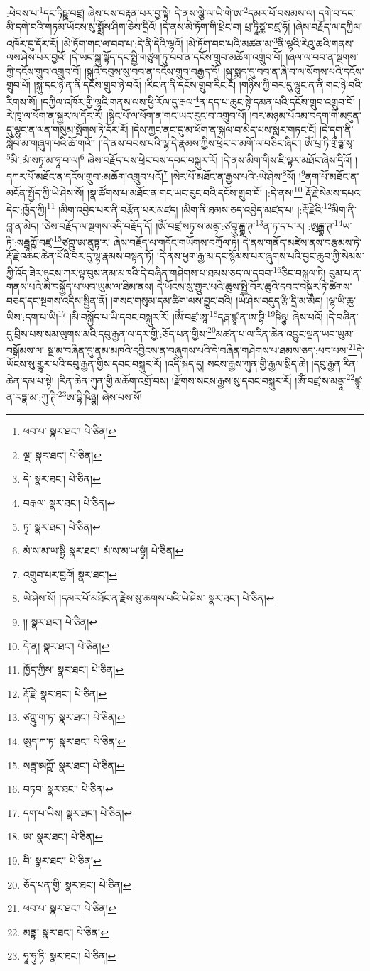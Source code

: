 :ཕེབས་པ་\footnote{ཕབ་པ་  སྣར་ཐང་།  པེ་ཅིན། }དང་ཏིཥྛ་བཛྲ། ཞེས་པས་བརྟན་པར་བྱ་སྟེ། དེ་ནས་ལྕེ་ལ་ཡི་གེ་ཨ་\footnote{ལྔ་  སྣར་ཐང་།  པེ་ཅིན། }དམར་པོ་བསམས་ལ། དགེ་བ་དང་མི་དགེ་བའི་གཏམ་ཡོངས་སུ་སྨྲོས་ཤིག་ཅེས་དྲིའོ། །དེ་ནས་མེ་ཏོག་གི་ཕྲེང་བ། པྲ་ཏཱིཙྪ་བཛྲ་ཧོ། །ཞེས་བརྗོད་ལ་དཀྱིལ་འཁོར་དུ་དོར་རོ། །མེ་ཏོག་གང་ལ་བབ་པ་:དེ་ནི་དེའི་ལྷའོ། །མེ་ཏོག་བབ་པའི་མཚན་མ་\footnote{དེ་  སྣར་ཐང་།  པེ་ཅིན། }ནི་ལྷའི་རེའུ་ཆའི་གནས་ལས་ཤེས་པར་བྱའོ། །དེ་ཡང་སྐུ་སྟོད་དང་སྤྱི་གཙུག་ཏུ་བབ་ན་དངོས་གྲུབ་མཆོག་འགྲུབ་བོ། །ཞལ་ལ་བབ་ན་སྔགས་ཀྱི་དངོས་གྲུབ་འགྲུབ་བོ། །སྐུའི་དབུས་སུ་བབ་ན་དངོས་གྲུབ་བརྒྱད་དོ། །སྐུ་སྨད་དུ་བབ་ན་ཞི་བ་ལ་སོགས་པའི་དངོས་གྲུབ་པོ། །སྐུ་དང་ཉེ་ན་ནི་དངོས་གྲུབ་ཉེ་བའོ། །རིང་ན་ནི་དངོས་གྲུབ་རིང་ངོ། །གཉིས་ཀྱི་བར་དུ་ལྷུང་ན་ནི་གང་ཉེ་བའི་རིགས་སོ། །དཀྱིལ་འཁོར་གྱི་ལྷའི་གནས་ལས་ཕྱི་རོལ་དུ་རྒལ་\footnote{བརྒལ་  སྣར་ཐང་།  པེ་ཅིན། }ན་དད་པ་ཆུང་སྟེ་དམན་པའི་དངོས་གྲུབ་འགྲུབ་བོ། །རེ་ཁཱ་ལ་ཕོག་ན་སྐྱར་ལ་དོར་རོ། །སྙིང་པོ་ལ་ཕོག་ན་གང་ཡང་རུང་བ་འགྲུབ་པོ། །བར་མཉམ་པོའམ་བདག་གི་མདུན་དུ་ལྷུང་ན་ལན་གསུམ་སྤོགས་ཏེ་དོར་རོ། །དེས་ཀྱང་ནང་དུ་མ་ཕོག་ན་སྐལ་བ་མེད་པས་སླར་གཏང་ངོ། །དེ་དག་ནི་སློབ་མ་གཞུག་པའི་ཆོ་གའོ།། །།དེ་ནས་བབས་པའི་ལྷ་དེ་རྣམས་ཀྱིས་ཕྲེང་བ་མགོ་ལ་བཅིང་ཞིང་། ཨོཾ་པྲ་ཏི་གྲྀཧྞ་སྭ་\footnote{ཏྭ་  སྣར་ཐང་།  པེ་ཅིན། }མི་:མཾ་སཏྭ་མ་ཧཱ་བ་ལ།\footnote{མཾ་ས་མ་ཡ་སྟྲི  སྣར་ཐང་། མཾ་ས་མ་ཡ་སྟྭཾ།  པེ་ཅིན། } ཞེས་བརྗོད་པས་ཕྲེང་བས་དབང་བསྐུར་རོ། །དེ་ནས་མིག་གིས་ཇི་ལྟར་མཐོང་ཞེས་དྲིའོ། །དཀར་པོ་མཐོང་ན་དངོས་གྲུབ་:མཆོག་འགྲུབ་པའོ།\footnote{འགྲུབ་པར་བྱའོ།  སྣར་ཐང་། } །སེར་པོ་མཐོང་ན་རྒྱས་པའི་:ཡེ་ཤེས་\footnote{ཡེ་ཤེས་སོ། །དམར་པོ་མཐོང་ན་རྗེས་སུ་ཆགས་པའི་ཡེ་ཤེས་  སྣར་ཐང་།  པེ་ཅིན། }སོ། །\footnote{།།  སྣར་ཐང་།  པེ་ཅིན། }ནག་པོ་མཐོང་ན་མངོན་སྤྱོད་ཀྱི་ཡེ་ཤེས་སོ། །སྣ་ཚོགས་པ་མཐོང་ན་གང་ཡང་རུང་བའི་དངོས་གྲུབ་བོ། །:དེ་ནས།\footnote{དེ་ན།  སྣར་ཐང་།  པེ་ཅིན། } རྡོ་རྗེ་སེམས་དཔའ་དེང་:ཁྱོད་ཀྱི།\footnote{ཁྱོད་ཀྱིས།  སྣར་ཐང་།  པེ་ཅིན། } །མིག་འབྱེད་པར་ནི་བརྩོན་པར་མཛད། །མིག་ནི་ཐམས་ཅད་འབྱེད་མཛད་པ། །:རྡོ་རྗེའི་\footnote{རྡོ་རྗེ་  སྣར་ཐང་།  པེ་ཅིན། }མིག་ནི་བླ་ན་མེད། །ཅེས་བརྗོད་ལ་སྔགས་འདི་བརྗོད་དོ། །ཨོཾ་བཛྲ་སཏྭ་ས་མནྟ་:ཙཀྵཱུ་དྒྷ་ཊ་\footnote{ཙཀྵུ་ག་ཏ་  སྣར་ཐང་།  པེ་ཅིན། }ན་ཏ་ད་པ་ར། :ཨུདྒྷ་ཊ་\footnote{ཨུད་ཀ་ཏ་  སྣར་ཐང་།  པེ་ཅིན། }ཡ་ཏི་:སརྦྦཱཀྵོ་བཛྲ་\footnote{སརྦྦ་ཨཀྵོ་  སྣར་ཐང་།  པེ་ཅིན། }ཙཀྵུ་ཨ་ནུཏྟ་ར། ཞེས་བརྗོད་ལ་གདོང་གཡོགས་བཀྲོལ་ཏེ། དེ་ནས་གནོད་མཛེས་ནས་བརྩམས་ཏེ་རྡོ་རྗེ་འཆང་ཆེན་པོའི་བར་དུ་ལྷ་རྣམས་བསྟན་ཏོ། །དེ་ནས་ཕྱག་རྒྱ་མ་དང་སྙོམས་པར་ཞུགས་པའི་བྱང་ཆུབ་ཀྱི་སེམས་ཀྱི་འོད་ཟེར་ཉུངས་ཀར་ལྟ་བུས་ནམ་མཁའི་དེ་བཞིན་གཤེགས་པ་ཐམས་ཅད་ལ་དབབ་\footnote{བཏབ་  སྣར་ཐང་།  པེ་ཅིན། }ཅིང་བསྐུལ་ཏེ། བུམ་པ་ན་གནས་པའི་མི་བསྐྱོད་པ་ཡབ་ཡུམ་ལ་ཐིམ་ནས། དེ་ཡོངས་སུ་གྱུར་པའི་ཆུས་སྤྱི་བོར་ཆུའི་དབང་བསྐུར་ཏེ་ཚིགས་བཅད་དང་སྔགས་འདིས་སྦྱིན་ནོ། །གསང་གསུམ་དམ་ཚིག་ལས་བྱུང་བའི། །ཡེ་ཤེས་བདུད་རྩི་དྲི་མ་མེད། །ལྷ་ཡི་ཆུ་ཡིས་:དག་པ་ཡི།\footnote{དག་པ་ཡིས།  སྣར་ཐང་།  པེ་ཅིན། } །མི་བསྐྱོད་པ་ཡི་དབང་བསྐུར་རོ། །ཨོཾ་བཛྲ་ཨཱ་\footnote{ཨ་  སྣར་ཐང་།  པེ་ཅིན། }དརྴ་ཛྙཱ་ན་ཨ་བྷི་\footnote{བི་  སྣར་ཐང་།  པེ་ཅིན། }ཥིཉྩ། ཞེས་པའོ། །དེ་བཞིན་དུ་བྲིས་པས་སམ་ལུགས་མའི་དབུ་རྒྱན་ལ་དར་གྱི་:ཅོད་པན་གྱིས་\footnote{ཅོད་པན་གྱི་  སྣར་ཐང་།  པེ་ཅིན། }མཚན་པ་ལ་རིན་ཆེན་འབྱུང་ལྡན་ཡབ་ཡུམ་བསྒོམས་ལ། སྔ་མ་བཞིན་དུ་ནམ་མཁའི་དབྱིངས་ན་བཞུགས་པའི་དེ་བཞིན་གཤེགས་པ་ཐམས་ཅད་:ཕབ་པས་\footnote{ཕབ་པ་  སྣར་ཐང་།  པེ་ཅིན། }དེ་ཡོངས་སུ་གྱུར་པའི་དབུ་རྒྱན་གྱིས་དབང་བསྐུར་རོ། །འདི་སྐད་དུ། སངས་རྒྱས་ཀུན་གྱི་རྒྱལ་སྲིད་ཆེ། །དབུ་རྒྱན་རིན་ཆེན་དམ་པ་སྟེ། །རིན་ཆེན་ཀུན་གྱི་མཆོག་འགྲོ་བས། །རྫོགས་སངས་རྒྱས་སུ་དབང་བསྐུར་རོ། །ཨོཾ་བཛྲ་ས་མནྟཱ་\footnote{མནྟ་  སྣར་ཐང་།  པེ་ཅིན། }ཛྙཱ་ན་རཏྣ་མ་:ཀུ་ཊི་\footnote{ཧཱ་ཧུ་ཏི་  སྣར་ཐང་།  པེ་ཅིན། }ཨ་བྷི་ཥིཉྩ། ཞེས་པས་སོ། 